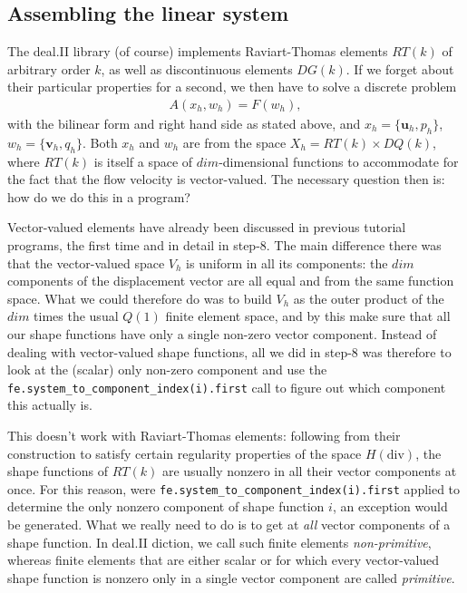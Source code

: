 \documentclass{article}
\renewcommand{\vec}[1]{\mathbf{#1}}
\begin{document}
\subsection*{Assembling the linear system}

The deal.II library (of course) implements Raviart-Thomas elements $RT(k)$ of
arbitrary order $k$, as well as discontinuous elements $DG(k)$. If we forget
about their particular properties for a second, we then have to solve a
discrete problem
\begin{align*}
  A(x_h,w_h) = F(w_h),
\end{align*}
with the bilinear form and right hand side as stated above, and $x_h=\{\vec
u_h,p_h\}$, $w_h=\{\vec v_h,q_h\}$. Both $x_h$ and $w_h$ are from the space
$X_h=RT(k)\times DQ(k)$, where $RT(k)$ is itself a space of $dim$-dimensional
functions to accommodate for the fact that the flow velocity is vector-valued.
The necessary question then is: how do we do this in a program?

Vector-valued elements have already been discussed in previous tutorial
programs, the first time and in detail in step-8. The main difference there
was that the vector-valued space $V_h$ is uniform in all its components: the
$dim$ components of the displacement vector are all equal and from the same
function space. What we could therefore do was to build $V_h$ as the outer
product of the $dim$ times the usual $Q(1)$ finite element space, and by this
make sure that all our shape functions have only a single non-zero vector
component. Instead of dealing with vector-valued shape functions, all we did
in step-8 was therefore to look at the (scalar) only non-zero component and
use the \texttt{fe.system\_to\_component\_index(i).first} call to figure out
which component this actually is.

This doesn't work with Raviart-Thomas elements: following from their
construction to satisfy certain regularity properties of the space
$H(\text{div})$, the shape functions of $RT(k)$ are usually nonzero in all
their vector components at once. For this reason, were
\texttt{fe.system\_to\_component\_index(i).first} applied to determine the only
nonzero component of shape function $i$, an exception would be generated. What
we really need to do is to get at \textit{all} vector components of a shape
function. In deal.II diction, we call such finite elements
\textit{non-primitive}, whereas finite elements that are either scalar or for
which every vector-valued shape function is nonzero only in a single vector
component are called \textit{primitive}.
\end{document}
